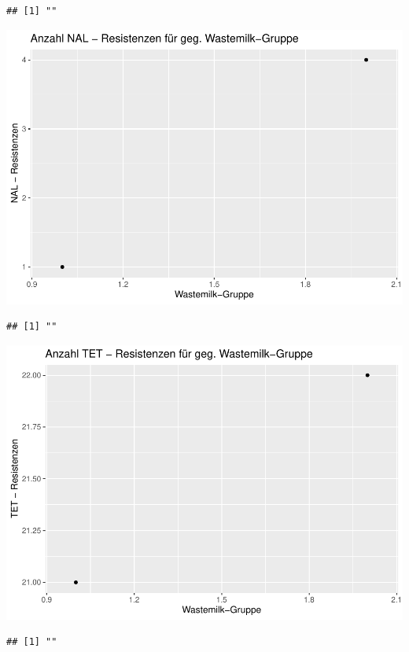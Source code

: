 \documentclass[
]{article}
\begin{document}
\begin{verbatim}
## [1] ""
\end{verbatim}

\includegraphics{NResistenzen_files/figure-latex/unnamed-chunk-7-7.pdf}

\begin{verbatim}
## [1] ""
\end{verbatim}

\includegraphics{NResistenzen_files/figure-latex/unnamed-chunk-7-8.pdf}

\begin{verbatim}
## [1] ""
\end{verbatim}
\end{document}
